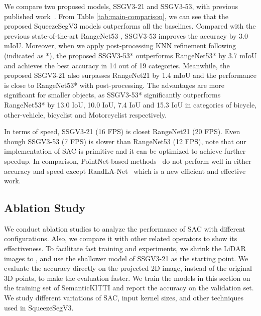 \documentclass[runningheads]{llncs}
\begin{document}
We compare two proposed models, SSGV3-21 and SSGV3-53, with previous published work~\cite{qi2017pointnet,qi2017pointnet++,landrieu2018large,su2018splatnet,tatarchenko2018tangent,wu2017squeezeseg,wu2018squeezesegv2,milioto2019rangenet++}. From Table \ref{tab:main-comparison}, we can see that the proposed SqueezeSegV3 models outperforms all the baselines. Compared with the previous state-of-the-art RangeNet53 \cite{milioto2019rangenet++}, SSGV3-53 improves the accuracy by 3.0 mIoU. Moreover, when we apply post-processing KNN refinement following~\cite{milioto2019rangenet++} (indicated as *), the proposed SSGV3-53* outperforms RangeNet53* by 3.7 mIoU and achieves the best accuracy in 14 out of 19 categories. Meanwhile, the proposed SSGV3-21 also surpasses RangeNet21 by 1.4 mIoU and the performance is close to RangeNet53* with post-processing. The advantages are more significant for smaller objects, as SSGV3-53* significantly outperforms RangeNet53* by 13.0 IoU, 10.0 IoU, 7.4 IoU and 15.3 IoU in categories of bicycle, other-vehicle, bicyclist and Motorcyclist respectively. 

In terms of speed, SSGV3-21 (16 FPS) is closet RangeNet21 (20 FPS). Even though SSGV3-53 (7 FPS) is slower than RangeNet53 (12 FPS), note that our implementation of SAC is primitive and it can be optimized to achieve further speedup.
In comparison, PointNet-based methods~\cite{qi2017pointnet,qi2017pointnet++,landrieu2018large,su2018splatnet,tatarchenko2018tangent} do not perform well in either accuracy and speed except RandLA-Net~\cite{hu2019randla} which is a new efficient and effective work.



\subsection{Ablation Study}
\label{sec:ablation}
We conduct ablation studies to analyze the performance of SAC with different configurations. Also, we compare it with other related operators to show its effectiveness. To facilitate fast training and experiments, we shrink the LiDAR images to , and use the shallower model of SSGV3-21 as the starting point. 
We evaluate the accuracy directly on the projected 2D image, instead of the original 3D points, to make the evaluation faster. We train the models in this section on the training set of SemanticKITTI and report the accuracy on the validation set. We study different variations of SAC, input kernel sizes, and other techniques used in SqueezeSegV3. 
\end{document}
